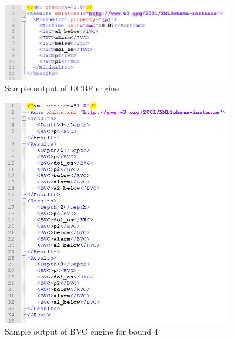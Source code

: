 \begin{figure}
  \centering
  \includegraphics[width=0.9\textwidth]{figs/ucbfout.jpg}
  \caption{Sample output of UCBF engine}
  \label{fig:ucbfout}
\end{figure}

\begin{figure}
  \centering
  \includegraphics[width=0.9\textwidth]{figs/bvcout.jpg}
  \caption{Sample output of BVC engine for bound 4}
  \label{fig:bvcout}
\end{figure}








